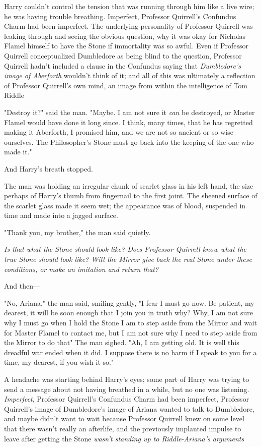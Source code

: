 Harry couldn't control the tension that was running through him like a live
wire; he was having trouble breathing. Imperfect, Professor Quirrell's
Confundus Charm had been imperfect. The underlying personality of Professor
Quirrell was leaking through and seeing the obvious question, why it was okay
for Nicholas Flamel himself to have the Stone if immortality was so awful. Even
if Professor Quirrell conceptualized Dumbledore as being blind to the question,
Professor Quirrell hadn't included a clause in the Confundus saying that
\emph{Dumbledore's image of Aberforth} wouldn't think of it; and all of this
was ultimately a reflection of Professor Quirrell's own mind, an image from
within the intelligence of Tom Riddle{\el}

"Destroy it?" said the man. "Maybe. I am not sure it \emph{can} be destroyed,
or Master Flamel would have done it long since. I think, many times, that he
has regretted making it{\el} Aberforth, I promised him, and we are not so
ancient or so wise ourselves. The Philosopher's Stone must go back into the
keeping of the one who made it."

And Harry's breath stopped.

The man was holding an irregular chunk of scarlet glass in his left hand, the
size perhaps of Harry's thumb from fingernail to the first joint. The sheened
surface of the scarlet glass made it seem wet; the appearance was of blood,
suspended in time and made into a jagged surface.

"Thank you, my brother," the man said quietly.

\emph{Is that what the Stone should look like? Does Professor Quirrell know
what the true Stone should look like? Will the Mirror give back the real Stone
under these conditions, or make an imitation and return that?}

And then---

"No, Ariana," the man said, smiling gently, "I fear I must go now. Be patient,
my dearest, it will be soon enough that I join you in truth{\el} why? Why, I
am not sure why I must go{\el} when I hold the Stone I am to step aside from
the Mirror and wait for Master Flamel to contact me, but I am not sure why I
need to step aside from the Mirror to do that{\el}" The man sighed. "Ah, I
am getting old. It is well this dreadful war ended when it did. I suppose there
is no harm if I speak to you for a time, my dearest, if you wish it so."

A headache was starting behind Harry's eyes; some part of Harry was trying to
send a message about not having breathed in a while, but no one was listening.
\emph{ Imperfect}, Professor Quirrell's Confundus Charm had been imperfect,
Professor Quirrell's image of Dumbledore's image of Ariana wanted to talk to
Dumbledore, and maybe didn't want to wait because Professor Quirrell knew on
some level that there wasn't really an afterlife, and the previously implanted
impulse to leave after getting the Stone \emph{wasn't standing up to
Riddle-Ariana's arguments{\el}}

